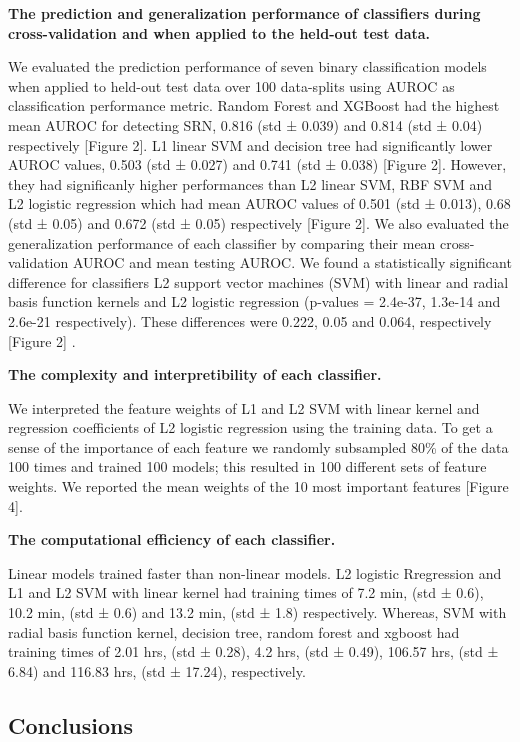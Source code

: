 \documentclass[11pt,]{article}
\begin{document}
\textbf{The prediction and generalization performance of classifiers
during cross-validation and when applied to the held-out test data.}

We evaluated the prediction performance of seven binary classification
models when applied to held-out test data over 100 data-splits using
AUROC as classification performance metric. Random Forest and XGBoost
had the highest mean AUROC for detecting SRN, 0.816 (std ± 0.039) and
0.814 (std ± 0.04) respectively {[}Figure 2{]}. L1 linear SVM and
decision tree had significantly lower AUROC values, 0.503 (std ± 0.027)
and 0.741 (std ± 0.038) {[}Figure 2{]}. However, they had significanly
higher performances than L2 linear SVM, RBF SVM and L2 logistic
regression which had mean AUROC values of 0.501 (std ± 0.013), 0.68 (std
± 0.05) and 0.672 (std ± 0.05) respectively {[}Figure 2{]}. We also
evaluated the generalization performance of each classifier by comparing
their mean cross-validation AUROC and mean testing AUROC. We found a
statistically significant difference for classifiers L2 support vector
machines (SVM) with linear and radial basis function kernels and L2
logistic regression (p-values = 2.4e-37, 1.3e-14 and 2.6e-21
respectively). These differences were 0.222, 0.05 and 0.064,
respectively {[}Figure 2{]} .

\textbf{The complexity and interpretibility of each classifier.}

We interpreted the feature weights of L1 and L2 SVM with linear kernel
and regression coefficients of L2 logistic regression using the training
data. To get a sense of the importance of each feature we randomly
subsampled 80\% of the data 100 times and trained 100 models; this
resulted in 100 different sets of feature weights. We reported the mean
weights of the 10 most important features {[}Figure 4{]}.

\textbf{The computational efficiency of each classifier.}

Linear models trained faster than non-linear models. L2 logistic
Rregression and L1 and L2 SVM with linear kernel had training times of
7.2 min, (std ± 0.6), 10.2 min, (std ± 0.6) and 13.2 min, (std ± 1.8)
respectively. Whereas, SVM with radial basis function kernel, decision
tree, random forest and xgboost had training times of 2.01 hrs, (std ±
0.28), 4.2 hrs, (std ± 0.49), 106.57 hrs, (std ± 6.84) and 116.83 hrs,
(std ± 17.24), respectively.

\subsection{Conclusions}\label{conclusions}
\end{document}
